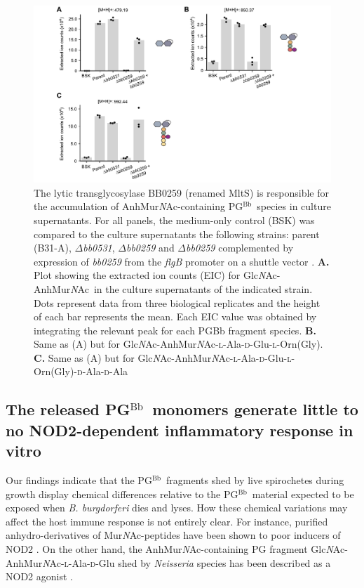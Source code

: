 \documentclass[twoside, watermark]{zHenriquesLab-StyleBioRxiv}
\newcommand{\pgbb}{PG$^\text{Bb}$}
\newcommand{\Z}{Glc\textit{N}Ac-AnhMur\textit{N}Ac}
\newcommand{\ZAEOG}{Glc\textit{N}Ac-AnhMur\textit{N}Ac-\textsc{l}-Ala-\textsc{d}-Glu-\textsc{l}-Orn(Gly)}
\newcommand{\ZAEOAAG}{Glc\textit{N}Ac-AnhMur\textit{N}Ac-\textsc{l}-Ala-\textsc{d}-Glu-\textsc{l}-Orn(Gly)-\textsc{d}-Ala-\textsc{d}-Ala}
\newcommand{\NAM}{Mur\textit{N}Ac}
\newcommand{\AnhNAM}{AnhMur\textit{N}Ac}
\newcommand{\NAG}{Glc\textit{N}Ac}
\newcommand{\scl}{\textsc{l}} %
\newcommand{\scd}{\textsc{d}} %
\begin{document}
\begin{figure}
    \centering
    \includegraphics[width=\textwidth]{Figures/Figure_4_LTase_Anhydro_Shedding.pdf}
    \caption{The lytic transglycosylase BB0259 (renamed MltS) is responsible for the accumulation of \AnhNAM-containing \pgbb~species in culture supernatants. For all panels, the medium-only control (BSK) was compared to the culture supernatants the following strains: parent (B31-A), $\Delta$\textit{bb0531}, $\Delta$\textit{bb0259} and $\Delta$\textit{bb0259} complemented by expression of \textit{bb0259} from the \textit{flgB} promoter on a shuttle vector \cite{Xu2021}. \textbf{A.} Plot showing the extracted ion counts (EIC) for \Z~in the culture supernatants of the indicated strain. Dots represent data from three biological replicates and the height of each bar represents the mean. Each EIC value was obtained by integrating the relevant peak for each PGBb fragment species. \textbf{B.} Same as (A) but for \ZAEOG. \textbf{C.} Same as (A) but for \ZAEOAAG}
    \label{fig: fig4}
\end{figure}

\subsection*{The released \pgbb~monomers generate little to no NOD2-dependent inflammatory response in vitro}
Our findings indicate that the \pgbb~fragments shed by live spirochetes during growth display chemical differences relative to the \pgbb~material expected to be exposed when \textit{B. burgdorferi} dies and lyses. How these chemical variations may affect the host immune response is not entirely clear. For instance, purified anhydro-derivatives of \NAM-peptides have been shown to poor inducers of NOD2 \cite{Chaput2006,Knilans2018}. On the other hand, the \AnhNAM-containing PG fragment \NAG-\AnhNAM-\scl-Ala-\scd-Glu shed by \textit{Neisseria} species has been described as a NOD2 agonist \cite{Harris2024}.
\end{document}
